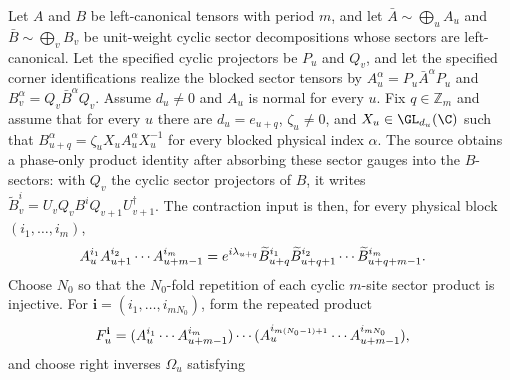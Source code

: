 \begin{lemma}%
    \label{lem:sector_tensor_proportional_blocked_match}
    \leanok
    Let $A$ and $B$ be left-canonical tensors with period $m$, and let
    $\bar A\sim\bigoplus_u A_u$ and $\bar B\sim\bigoplus_v B_v$ be unit-weight
    cyclic sector decompositions whose sectors are left-canonical. Let the
    specified cyclic projectors be $P_u$ and $Q_v$, and let the specified
    corner identifications realize the blocked sector tensors by
    $A_u^\alpha=P_u\bar A^\alpha P_u$ and
    $B_v^\alpha=Q_v\bar B^\alpha Q_v$.
    Assume
    $d_u\ne0$ and $A_u$ is normal for every $u$. Fix $q\in\mathbb Z_m$ and
    assume that for every $u$ there are $d_u=e_{u+q}$, $\zeta_u\ne0$, and
    $X_u\in\GL_{d_u}(\C)$ such that
    $B_{u+q}^\alpha=\zeta_u X_u A_u^\alpha X_u^{-1}$ for every blocked
    physical index $\alpha$. The source obtains a phase-only product identity
    after absorbing these sector gauges into the $B$-sectors: with $Q_v$ the
    cyclic sector projectors of $B$, it writes
    $\widetilde B_v^i
        =U_v Q_v B^i Q_{v+1} U_{v+1}^{\dagger}$.
    The contraction input is then, for every physical block
    $(i_1,\ldots,i_m)$,
    \begin{align}
        A_u^{i_1}A_{u+1}^{i_2}\cdots A_{u+m-1}^{i_m}
         & =
        e^{i\lambda_{u+q}}
        \widetilde B_{u+q}^{i_1}\widetilde B_{u+q+1}^{i_2}
        \cdots\widetilde B_{u+q+m-1}^{i_m}.
        \notag
    \end{align}
    Choose $N_0$ so that the $N_0$-fold repetition of each cyclic
    $m$-site sector product is injective. For
    $\mathbf i=(i_1,\ldots,i_{mN_0})$, form the repeated product
    \begin{align}
        F_u^{\mathbf i}
         & =
        (A_u^{i_1}\cdots A_{u+m-1}^{i_m})
        \cdots
        (A_u^{i_{m(N_0-1)+1}}\cdots A_{u+m-1}^{i_{mN_0}}),
        \notag
    \end{align}
    and choose right inverses $\Omega_u$ satisfying
    \begin{align}

\end{align}
\end{lemma}
